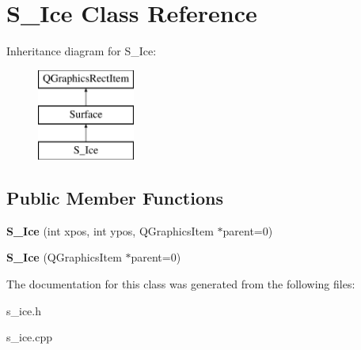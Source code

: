 \hypertarget{class_s___ice}{}\section{S\+\_\+\+Ice Class Reference}
\label{class_s___ice}
Inheritance diagram for S\+\_\+\+Ice\+:\begin{figure}[H]
\begin{center}
\leavevmode
\includegraphics[height=3.000000cm]{class_s___ice}
\end{center}
\end{figure}
\subsection*{Public Member Functions}
\begin{DoxyCompactItemize}
\item 
\hypertarget{class_s___ice_a3a1fdb0204964dfee672629d22cd0e76}{}{\bfseries S\+\_\+\+Ice} (int xpos, int ypos, Q\+Graphics\+Item $\ast$parent=0)\label{class_s___ice_a3a1fdb0204964dfee672629d22cd0e76}

\item 
\hypertarget{class_s___ice_a17b24abf85ec0bd466971675b657f856}{}{\bfseries S\+\_\+\+Ice} (Q\+Graphics\+Item $\ast$parent=0)\label{class_s___ice_a17b24abf85ec0bd466971675b657f856}

\end{DoxyCompactItemize}


The documentation for this class was generated from the following files\+:\begin{DoxyCompactItemize}
\item 
s\+\_\+ice.\+h\item 
s\+\_\+ice.\+cpp\end{DoxyCompactItemize}
